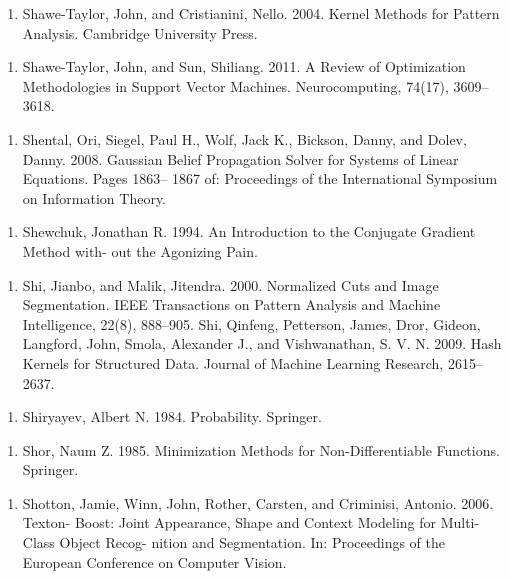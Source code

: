 \begin{enumerate}
\item Shawe-Taylor, John, and Cristianini, Nello. 2004. Kernel Methods for Pattern Analysis. Cambridge University Press.
\end{enumerate}

\begin{enumerate}
\item Shawe-Taylor, John, and Sun, Shiliang. 2011. A Review of Optimization Methodologies in Support Vector Machines. Neurocomputing, 74(17), 3609–3618.
\end{enumerate}

\begin{enumerate}
\item Shental, Ori, Siegel, Paul H., Wolf, Jack K., Bickson, Danny, and Dolev, Danny. 2008. Gaussian Belief Propagation Solver for Systems of Linear Equations. Pages 1863– 1867 of: Proceedings of the International Symposium on Information Theory.
\end{enumerate}

\begin{enumerate}
\item Shewchuk, Jonathan R. 1994. An Introduction to the Conjugate Gradient Method with- out the Agonizing Pain.
\end{enumerate}

\begin{enumerate}
\item Shi, Jianbo, and Malik, Jitendra. 2000. Normalized Cuts and Image Segmentation. IEEE Transactions on Pattern Analysis and Machine Intelligence, 22(8), 888–905. Shi, Qinfeng, Petterson, James, Dror, Gideon, Langford, John, Smola, Alexander J., and Vishwanathan, S. V. N. 2009. Hash Kernels for Structured Data. Journal of Machine Learning Research, 2615–2637.
\end{enumerate}

\begin{enumerate}
\item Shiryayev, Albert N. 1984. Probability. Springer.
\end{enumerate}

\begin{enumerate}
\item Shor, Naum Z. 1985. Minimization Methods for Non-Differentiable Functions. Springer.
\end{enumerate}

\begin{enumerate}
\item Shotton, Jamie, Winn, John, Rother, Carsten, and Criminisi, Antonio. 2006. Texton- Boost: Joint Appearance, Shape and Context Modeling for Multi-Class Object Recog- nition and Segmentation. In: Proceedings of the European Conference on Computer Vision.
\end{enumerate}


